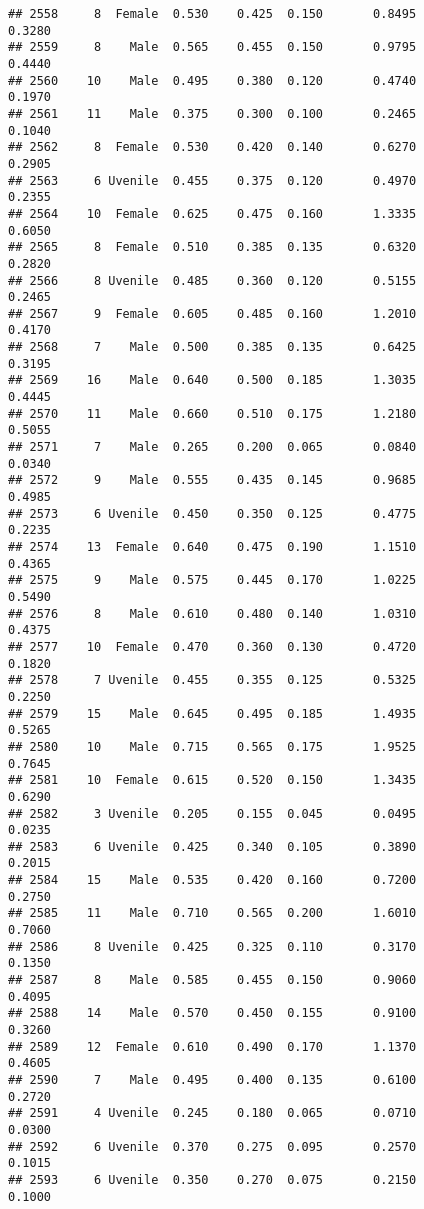 \documentclass[
]{article}
\begin{document}
\begin{verbatim}
## 2558     8  Female  0.530    0.425  0.150       0.8495         0.3280
## 2559     8    Male  0.565    0.455  0.150       0.9795         0.4440
## 2560    10    Male  0.495    0.380  0.120       0.4740         0.1970
## 2561    11    Male  0.375    0.300  0.100       0.2465         0.1040
## 2562     8  Female  0.530    0.420  0.140       0.6270         0.2905
## 2563     6 Uvenile  0.455    0.375  0.120       0.4970         0.2355
## 2564    10  Female  0.625    0.475  0.160       1.3335         0.6050
## 2565     8  Female  0.510    0.385  0.135       0.6320         0.2820
## 2566     8 Uvenile  0.485    0.360  0.120       0.5155         0.2465
## 2567     9  Female  0.605    0.485  0.160       1.2010         0.4170
## 2568     7    Male  0.500    0.385  0.135       0.6425         0.3195
## 2569    16    Male  0.640    0.500  0.185       1.3035         0.4445
## 2570    11    Male  0.660    0.510  0.175       1.2180         0.5055
## 2571     7    Male  0.265    0.200  0.065       0.0840         0.0340
## 2572     9    Male  0.555    0.435  0.145       0.9685         0.4985
## 2573     6 Uvenile  0.450    0.350  0.125       0.4775         0.2235
## 2574    13  Female  0.640    0.475  0.190       1.1510         0.4365
## 2575     9    Male  0.575    0.445  0.170       1.0225         0.5490
## 2576     8    Male  0.610    0.480  0.140       1.0310         0.4375
## 2577    10  Female  0.470    0.360  0.130       0.4720         0.1820
## 2578     7 Uvenile  0.455    0.355  0.125       0.5325         0.2250
## 2579    15    Male  0.645    0.495  0.185       1.4935         0.5265
## 2580    10    Male  0.715    0.565  0.175       1.9525         0.7645
## 2581    10  Female  0.615    0.520  0.150       1.3435         0.6290
## 2582     3 Uvenile  0.205    0.155  0.045       0.0495         0.0235
## 2583     6 Uvenile  0.425    0.340  0.105       0.3890         0.2015
## 2584    15    Male  0.535    0.420  0.160       0.7200         0.2750
## 2585    11    Male  0.710    0.565  0.200       1.6010         0.7060
## 2586     8 Uvenile  0.425    0.325  0.110       0.3170         0.1350
## 2587     8    Male  0.585    0.455  0.150       0.9060         0.4095
## 2588    14    Male  0.570    0.450  0.155       0.9100         0.3260
## 2589    12  Female  0.610    0.490  0.170       1.1370         0.4605
## 2590     7    Male  0.495    0.400  0.135       0.6100         0.2720
## 2591     4 Uvenile  0.245    0.180  0.065       0.0710         0.0300
## 2592     6 Uvenile  0.370    0.275  0.095       0.2570         0.1015
## 2593     6 Uvenile  0.350    0.270  0.075       0.2150         0.1000

\end{verbatim}
\end{document}
